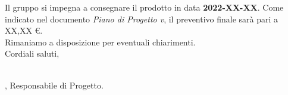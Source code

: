 \documentclass[a4paper]{scrlttr2}
\begin{document}
Il gruppo si impegna a consegnare il prodotto in data \textbf{2022-XX-XX}. Come indicato nel documento \textit{Piano di Progetto v}, il preventivo finale sarà pari a XX,XX \euro{}. \\

Rimaniamo a disposizione per eventuali chiarimenti. \\

Cordiali saluti,

\begin{flushright}
\vspace*{30px}
\par\noindent\makebox[7.5cm]{\hrulefill} \\
\textit{\MG{}}, Responsabile di Progetto.
\end{flushright}
\end{document}
